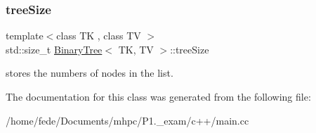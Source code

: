\subsubsection{\texorpdfstring{treeSize}{treeSize}}
{\footnotesize\ttfamily template$<$class TK , class TV $>$ \\
std\+::size\+\_\+t \mbox{\hyperlink{classBinaryTree}{Binary\+Tree}}$<$ TK, TV $>$\+::tree\+Size\hspace{0.3cm}{\ttfamily [private]}}

stores the numbers of nodes in the list. 

The documentation for this class was generated from the following file\+:\begin{DoxyCompactItemize}
\item 
/home/fede/\+Documents/mhpc/\+P1.\+\_\+exam/c++/main.\+cc\end{DoxyCompactItemize}
